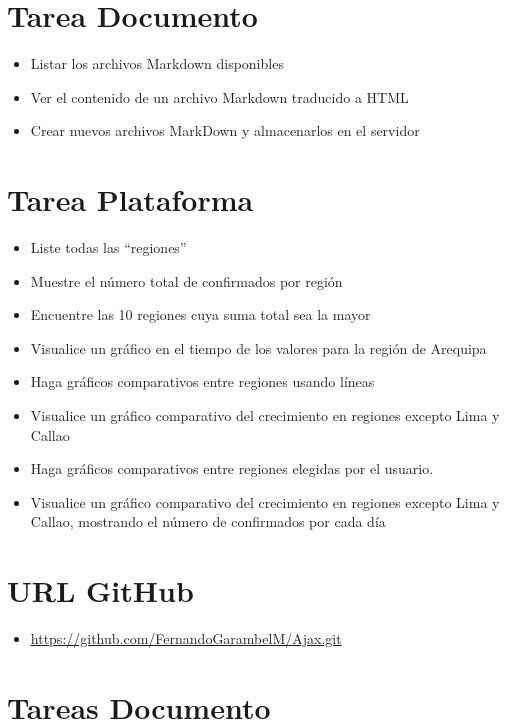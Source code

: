 \documentclass{article}
\begin{document}
	\clearpage




	\section{Tarea Documento}
	\begin{itemize}		
		\item Listar los archivos Markdown disponibles
		\item Ver el contenido de un archivo Markdown traducido a HTML
		\item Crear nuevos archivos MarkDown y almacenarlos en el servidor
	\end{itemize}
	\section{Tarea Plataforma}
	\begin{itemize}		
		\item Liste todas las “regiones”
		\item Muestre el número total de confirmados por región
		\item Encuentre las 10 regiones cuya suma total sea la mayor
		\item Visualice un gráfico en el tiempo de los valores para la región de Arequipa
		\item Haga gráficos comparativos entre regiones usando líneas
		\item Visualice un gráfico comparativo del crecimiento en regiones excepto Lima y Callao
		\item Haga gráficos comparativos entre regiones elegidas por el usuario.
		\item Visualice un gráfico comparativo del crecimiento en regiones excepto Lima y Callao, mostrando el número de confirmados por cada día
	\end{itemize}
	\section{URL GitHub}
	\begin{itemize}
		\item \url{https://github.com/FernandoGarambelM/Ajax.git}
	\end{itemize}
	\clearpage
	\section{Tareas Documento}
\end{document}
